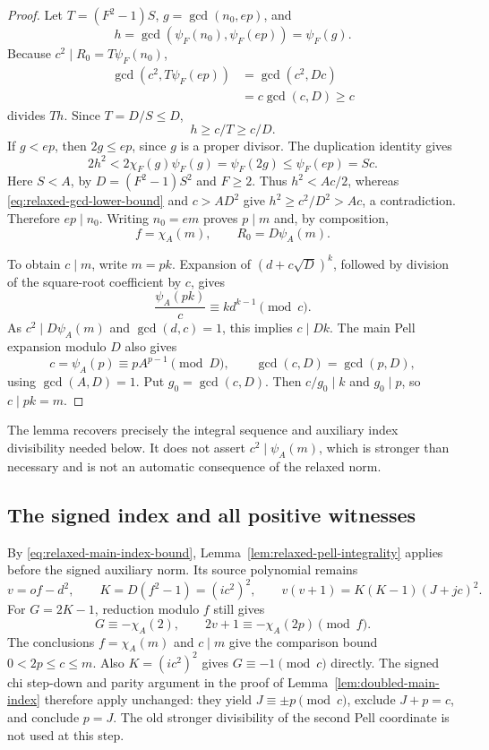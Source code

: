 \begin{proof}
Let $T=(F^2-1)S$, $g=\gcd(n_0,ep)$, and
\[
 h=\gcd(\psi_F(n_0),\psi_F(ep))=\psi_F(g).
\]
Because $c^2\mid R_0=T\psi_F(n_0)$,
\[
 \begin{aligned}
 \gcd(c^2,T\psi_F(ep))
   &=\gcd(c^2,Dc)\\
   &=c\gcd(c,D)\ge c
 \end{aligned}
\]
divides $T h$. Since $T=D/S\le D$,
\begin{equation}\label{eq:relaxed-gcd-lower-bound}
 h\ge c/T\ge c/D.
\end{equation}
If $g<ep$, then $2g\le ep$, since $g$ is a proper divisor. The
duplication identity gives
\[
 2h^2<2\chi_F(g)\psi_F(g)=\psi_F(2g)
       \le\psi_F(ep)=Sc.
\]
Here $S<A$, by $D=(F^2-1)S^2$ and $F\ge2$. Thus $h^2<Ac/2$,
whereas \eqref{eq:relaxed-gcd-lower-bound} and $c>AD^2$ give
$h^2\ge c^2/D^2>Ac$, a contradiction. Therefore $ep\mid n_0$.
Writing $n_0=em$ proves $p\mid m$ and, by composition,
\begin{equation}\label{eq:relaxed-integrality-restored}
 f=\chi_A(m),\qquad R_0=D\psi_A(m).
\end{equation}

To obtain $c\mid m$, write $m=pk$. Expansion of
$(d+c\sqrt D)^k$, followed by division of the square-root
coefficient by $c$, gives
\[
 \frac{\psi_A(pk)}c\equiv k d^{k-1}\pmod c.
\]
As $c^2\mid D\psi_A(m)$ and $\gcd(d,c)=1$, this implies
$c\mid Dk$. The main Pell expansion modulo $D$ also gives
\[
 c=\psi_A(p)\equiv pA^{p-1}\pmod D,
 \qquad \gcd(c,D)=\gcd(p,D),
\]
using $\gcd(A,D)=1$. Put $g_0=\gcd(c,D)$. Then $c/g_0\mid k$
and $g_0\mid p$, so $c\mid pk=m$.
\end{proof}

The lemma recovers precisely the integral sequence and auxiliary
index divisibility needed below. It does not assert
$c^2\mid\psi_A(m)$, which is stronger than necessary and is not
an automatic consequence of the relaxed norm.

\subsection{The signed index and all positive witnesses}

By \eqref{eq:relaxed-main-index-bound},
Lemma~\ref{lem:relaxed-pell-integrality} applies before the signed
auxiliary norm. Its source polynomial remains
\[
 v=of-d^2,\qquad K=D(f^2-1)=(ic^2)^2,\qquad
 v(v+1)=K(K-1)(J+jc)^2.
\]
For $G=2K-1$, reduction modulo $f$ still gives
\[
 G\equiv-\chi_A(2),\qquad
 2v+1\equiv-\chi_A(2p)\pmod f.
\]
The conclusions $f=\chi_A(m)$ and $c\mid m$ give the comparison
bound $0<2p\le c\le m$. Also $K=(ic^2)^2$ gives
$G\equiv-1\pmod c$ directly. The signed chi step-down and parity
argument in the proof of Lemma~\ref{lem:doubled-main-index} therefore
apply unchanged: they yield $J\equiv\pm p\pmod c$, exclude
$J+p=c$, and conclude $p=J$. The old stronger divisibility of the
second Pell coordinate is not used at this step.

